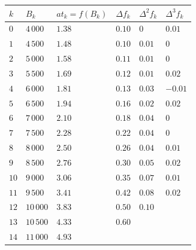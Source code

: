 \documentclass[
  10pt,
  fontset=fandol]{ctexart}
\newcounter{none} %
\begin{document}
{\def\LTcaptype{none} %
\begin{longtable}[]{@{}
  >{\raggedleft\arraybackslash}p{}
  >{\raggedleft\arraybackslash}p{}
  >{\raggedleft\arraybackslash}p{}
  >{\raggedleft\arraybackslash}p{}
  >{\raggedleft\arraybackslash}p{}
  >{\raggedleft\arraybackslash}p{}@{}}
\toprule\noalign{}
\begin{minipage}[b]{\linewidth}\raggedleft
\(k\)
\end{minipage} & \begin{minipage}[b]{\linewidth}\raggedleft
\(B_k\)
\end{minipage} & \begin{minipage}[b]{\linewidth}\raggedleft
\(at_k=f(B_k)\)
\end{minipage} & \begin{minipage}[b]{\linewidth}\raggedleft
\(\Delta f_k\)
\end{minipage} & \begin{minipage}[b]{\linewidth}\raggedleft
\(\Delta^2 f_k\)
\end{minipage} & \begin{minipage}[b]{\linewidth}\raggedleft
\(\Delta^3 f_k\)
\end{minipage} \\
\midrule\noalign{}
\endhead
\bottomrule\noalign{}
\endlastfoot
\(0\) & \(4\,000\) & \(1.38\) & \(0.10\) & \(0\) & \(0.01\) \\
\(1\) & \(4\,500\) & \(1.48\) & \(0.10\) & \(0.01\) & \(0\) \\
\(2\) & \(5\,000\) & \(1.58\) & \(0.11\) & \(0.01\) & \(0\) \\
\(3\) & \(5\,500\) & \(1.69\) & \(0.12\) & \(0.01\) & \(0.02\) \\
\(4\) & \(6\,000\) & \(1.81\) & \(0.13\) & \(0.03\) & \(-0.01\) \\
\(5\) & \(6\,500\) & \(1.94\) & \(0.16\) & \(0.02\) & \(0.02\) \\
\(6\) & \(7\,000\) & \(2.10\) & \(0.18\) & \(0.04\) & \(0\) \\
\(7\) & \(7\,500\) & \(2.28\) & \(0.22\) & \(0.04\) & \(0\) \\
\(8\) & \(8\,000\) & \(2.50\) & \(0.26\) & \(0.04\) & \(0.01\) \\
\(9\) & \(8\,500\) & \(2.76\) & \(0.30\) & \(0.05\) & \(0.02\) \\
\(10\) & \(9\,000\) & \(3.06\) & \(0.35\) & \(0.07\) & \(0.01\) \\
\(11\) & \(9\,500\) & \(3.41\) & \(0.42\) & \(0.08\) & \(0.02\) \\
\(12\) & \(10\,000\) & \(3.83\) & \(0.50\) & \(0.10\) & \\
\(13\) & \(10\,500\) & \(4.33\) & \(0.60\) & & \\
\(14\) & \(11\,000\) & \(4.93\) & & & \\
\end{longtable}
}
\end{document}
